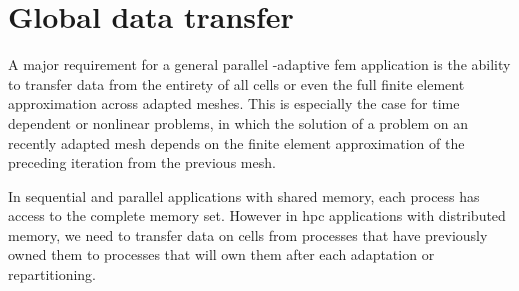 \section{Global data transfer}
\label{sec:transfer}




A major requirement for a general parallel \hp-adaptive \gls{fem} application is the ability to transfer data from the entirety of all cells or even the full finite element approximation across adapted meshes. This is especially the case for time dependent or nonlinear problems, in which the solution of a problem on an recently adapted mesh depends on the finite element approximation of the preceding iteration from the previous mesh.






In sequential and parallel applications with shared memory, each process has access to the complete memory set. However in \gls{hpc} applications with distributed memory, we need to transfer data on cells from processes that have previously owned them to processes that will own them after each adaptation or repartitioning.

